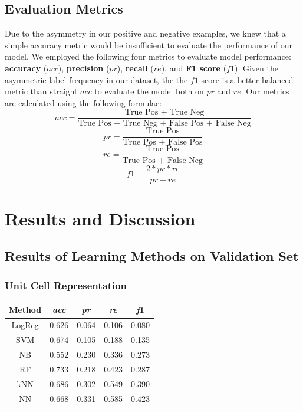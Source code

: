 \documentclass[10pt,twocolumn,letterpaper]{article}
\begin{document}
\subsection{Evaluation Metrics}

Due to the asymmetry in our positive and negative examples, we knew that a simple accuracy metric would be insufficient to evaluate the performance of our model. We employed the following four metrics to evaluate model performance: \textbf{accuracy} ($acc$), \textbf{precision} ($pr$), \textbf{recall} ($re$), and \textbf{F1 score} ($f1$). Given the asymmetric label frequency in our dataset, the the $f1$ score is a better balanced metric than straight $acc$ to evaluate the model both on $pr$ and $re$. Our metrics are calculated using the following formulae:
$$acc = \frac{\text{True Pos + True Neg}}{\text{True Pos + True Neg + False Pos + False Neg}}$$
$$pr = \frac{\text{True Pos}}{\text{True Pos + False Pos}} $$
$$re = \frac{\text{True Pos}}{\text{True Pos + False Neg}}$$
$$f1 = \frac{2 * pr * re}{pr + re}$$

\section{Results and Discussion}
\subsection{Results of Learning Methods on Validation Set}
\subsubsection{Unit Cell Representation}
\begin{center}
\begin{tabular}{|c|c|c|c|c|}
    \hline
    \textbf{Method} & \textbf{\textit{acc}} & \textbf{\textit{pr}} & \textbf{\textit{re}} & \textbf{\textit{f}1} \\
    \hline
    LogReg & 0.626 & 0.064 & 0.106 & 0.080 \\
    \hline
    SVM & 0.674 & 0.105 & 0.188 & 0.135 \\
    \hline
    NB & 0.552 & 0.230 & 0.336 & 0.273 \\
    \hline
    RF & 0.733 & 0.218 & 0.423 & 0.287 \\
    \hline
    kNN & 0.686 & 0.302 & 0.549 & 0.390 \\
    \hline
    NN & 0.668 & 0.331 & 0.585 & 0.423 \\
    \hline
\end{tabular}
\end{center}
\end{document}
